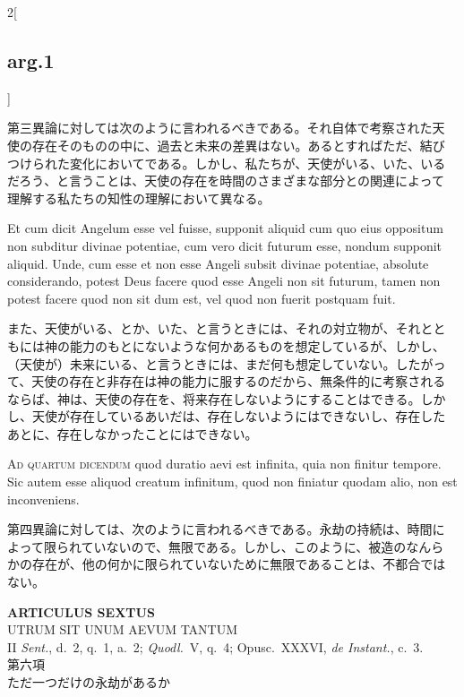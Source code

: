 \documentclass[paper=a4paper,fontsize=10pt,jafontsize=9pt,titlepage]{jlreq}
\begin{document}
\begin{paracol}{2}[\subsection{arg.1}]
\switchcolumn

第三異論に対しては次のように言われるべきである。それ自体で考察された天
使の存在そのものの中に、過去と未来の差異はない。あるとすればただ、結び
つけられた変化においてである。しかし、私たちが、天使がいる、いた、いる
だろう、と言うことは、天使の存在を時間のさまざまな部分との関連によって
理解する私たちの知性の理解において異なる。

\switchcolumn*

Et cum dicit Angelum esse
vel fuisse, supponit aliquid cum quo eius oppositum non subditur divinae
potentiae, cum vero dicit futurum esse, nondum supponit aliquid. Unde,
cum esse et non esse Angeli subsit divinae potentiae, absolute
considerando, potest Deus facere quod esse Angeli non sit futurum, tamen
non potest facere quod non sit dum est, vel quod non fuerit postquam
fuit.

\switchcolumn

また、天使がいる、とか、いた、と言うときには、それの対立物が、それとと
もには神の能力のもとにないような何かあるものを想定しているが、しかし、
（天使が）未来にいる、と言うときには、まだ何も想定していない。したがっ
て、天使の存在と非存在は神の能力に服するのだから、無条件的に考察される
ならば、神は、天使の存在を、将来存在しないようにすることはできる。しか
し、天使が存在しているあいだは、存在しないようにはできないし、存在した
あとに、存在しなかったことにはできない。

\switchcolumn*[\subsection{ad.4}]

{\scshape Ad quartum dicendum} quod duratio aevi est infinita, quia non
 finitur tempore. Sic autem esse aliquod creatum infinitum, quod non
 finiatur quodam alio, non est inconveniens.

\switchcolumn

第四異論に対しては、次のように言われるべきである。永劫の持続は、時間に
よって限られていないので、無限である。しかし、このように、被造のなんら
かの存在が、他の何かに限られていないために無限であることは、不都合では
ない。

\end{paracol}


\newpage
{}

\begin{center}
 {\Large {\bfseries ARTICULUS SEXTUS}}\\
 {\large UTRUM SIT UNUM AEVUM TANTUM}\\
 {\footnotesize II {\itshape Sent.}, d.~2, q.~1, a.~2; {\itshape
 Quodl.}~V, q.~4; Opusc.~XXXVI, {\itshape de Instant.}, c.~3.}\\
 {\Large 第六項\\ただ一つだけの永劫があるか}
\end{center}
\end{document}
